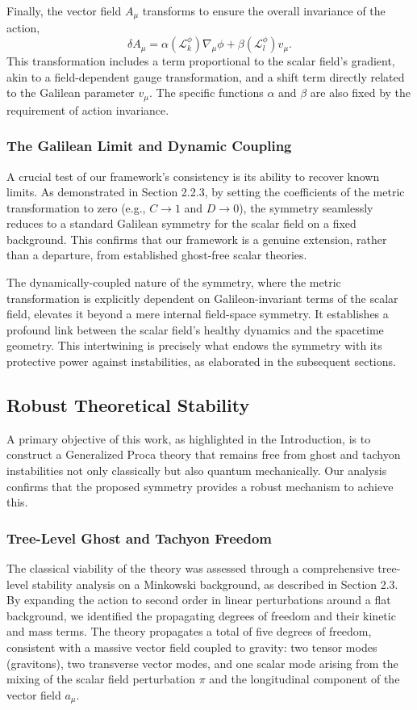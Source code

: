 \documentclass[twocolumn]{aastex631}
\begin{document}
Finally, the vector field $A_\mu$ transforms to ensure the overall invariance of the action,
\begin{equation}
\delta A_\mu = \alpha(\mathcal{L}_k^\phi) \nabla_\mu \phi + \beta(\mathcal{L}_l^\phi) v_\mu.
\end{equation}
This transformation includes a term proportional to the scalar field's gradient, akin to a field-dependent gauge transformation, and a shift term directly related to the Galilean parameter $v_\mu$. The specific functions $\alpha$ and $\beta$ are also fixed by the requirement of action invariance.

\subsubsection{The Galilean Limit and Dynamic Coupling}
A crucial test of our framework's consistency is its ability to recover known limits. As demonstrated in Section 2.2.3, by setting the coefficients of the metric transformation to zero (e.g., $C \to 1$ and $D \to 0$), the symmetry seamlessly reduces to a standard Galilean symmetry for the scalar field on a fixed background. This confirms that our framework is a genuine extension, rather than a departure, from established ghost-free scalar theories.

The dynamically-coupled nature of the symmetry, where the metric transformation is explicitly dependent on Galileon-invariant terms of the scalar field, elevates it beyond a mere internal field-space symmetry. It establishes a profound link between the scalar field's healthy dynamics and the spacetime geometry. This intertwining is precisely what endows the symmetry with its protective power against instabilities, as elaborated in the subsequent sections.

\subsection{Robust Theoretical Stability}

A primary objective of this work, as highlighted in the Introduction, is to construct a Generalized Proca theory that remains free from ghost and tachyon instabilities not only classically but also quantum mechanically. Our analysis confirms that the proposed symmetry provides a robust mechanism to achieve this.

\subsubsection{Tree-Level Ghost and Tachyon Freedom}
The classical viability of the theory was assessed through a comprehensive tree-level stability analysis on a Minkowski background, as described in Section 2.3. By expanding the action to second order in linear perturbations around a flat background, we identified the propagating degrees of freedom and their kinetic and mass terms. The theory propagates a total of five degrees of freedom, consistent with a massive vector field coupled to gravity: two tensor modes (gravitons), two transverse vector modes, and one scalar mode arising from the mixing of the scalar field perturbation $\pi$ and the longitudinal component of the vector field $a_\mu$.
\end{document}
